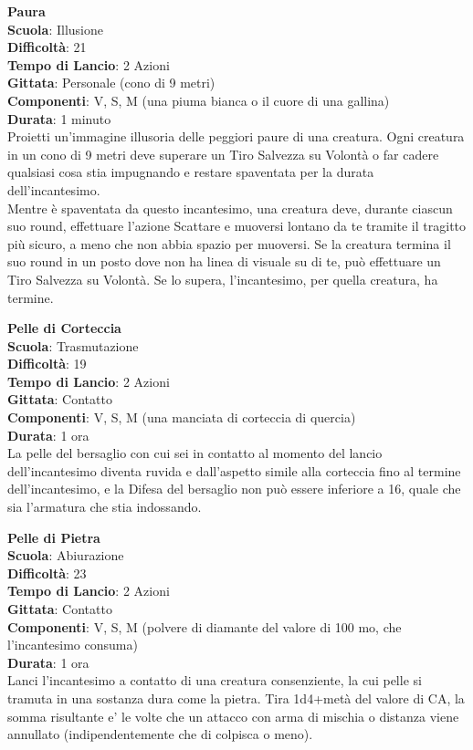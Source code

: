 \begin{multicols}{2}
\medskip\textbf{Paura}\\
\textbf{Scuola}: Illusione\\
\textbf{Difficoltà}: 21\\
\textbf{Tempo di Lancio}: 2 Azioni\\
\textbf{Gittata}: Personale (cono di 9 metri)\\
\textbf{Componenti}: V, S, M (una piuma bianca o il cuore di una gallina)\\
\textbf{Durata}: 1 minuto\\
Proietti un'immagine illusoria delle peggiori paure di una creatura. Ogni creatura in un cono di 9 metri deve superare un Tiro Salvezza su Volontà o far cadere qualsiasi cosa stia impugnando e restare spaventata per la durata dell'incantesimo.\\
Mentre è spaventata da questo incantesimo, una creatura deve, durante ciascun suo round, effettuare l'azione Scattare e muoversi lontano da te tramite il tragitto più sicuro, a meno che non abbia spazio per muoversi. Se la creatura termina il suo round in un posto dove non ha linea di visuale su di te, può effettuare un Tiro Salvezza su Volontà. Se lo supera, l'incantesimo, per quella creatura, ha termine. 

\medskip\textbf{Pelle di Corteccia}\\
\textbf{Scuola}: Trasmutazione\\
\textbf{Difficoltà}: 19\\
\textbf{Tempo di Lancio}: 2 Azioni\\
\textbf{Gittata}: Contatto\\
\textbf{Componenti}: V, S, M (una manciata di corteccia di quercia)\\
\textbf{Durata}: 1 ora\\
La pelle del bersaglio con cui sei in contatto al momento del lancio dell'incantesimo diventa ruvida e dall'aspetto simile alla corteccia fino al termine dell'incantesimo, e la Difesa del bersaglio non può essere inferiore a 16, quale che sia l'armatura che stia indossando.

\medskip\textbf{Pelle di Pietra}\\
\textbf{Scuola}: Abiurazione\\
\textbf{Difficoltà}: 23\\
\textbf{Tempo di Lancio}: 2 Azioni\\
\textbf{Gittata}: Contatto\\
\textbf{Componenti}: V, S, M (polvere di diamante del valore di 100 mo, che l'incantesimo consuma)\\
\textbf{Durata}: 1 ora\\
Lanci l'incantesimo a contatto di una creatura consenziente, la cui pelle si tramuta in una sostanza dura come la pietra. Tira 1d4+metà del valore di CA, la somma risultante e' le volte che un attacco con arma di mischia o distanza viene annullato (indipendentemente che di colpisca o meno).\\


\end{multicols}
